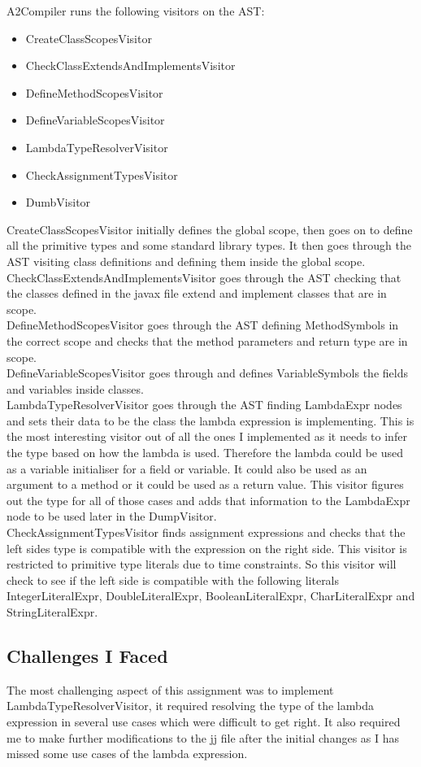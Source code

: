 \documentclass[twocolumn,notitlepage]{report}
\begin{document}
A2Compiler runs the following visitors on the AST:
\begin{itemize}
\item CreateClassScopesVisitor
\item CheckClassExtendsAndImplementsVisitor
\item DefineMethodScopesVisitor
\item DefineVariableScopesVisitor
\item LambdaTypeResolverVisitor
\item CheckAssignmentTypesVisitor
\item DumbVisitor
\end{itemize}
CreateClassScopesVisitor initially defines the global scope, then goes on to
define all the primitive types and some standard library types. It then goes
through the AST visiting class definitions and defining them inside the global
scope.\\
CheckClassExtendsAndImplementsVisitor goes through the AST checking that the
classes defined in the javax file extend and implement classes that are in
scope.\\
DefineMethodScopesVisitor goes through the AST defining MethodSymbols in the
correct scope and checks that the method parameters and return type are in
scope.\\
DefineVariableScopesVisitor goes through and defines VariableSymbols the fields
and variables inside classes.\\
LambdaTypeResolverVisitor goes through the AST finding LambdaExpr nodes and
sets their data to be the class the lambda expression is implementing. This is
the most interesting visitor out of all the ones I implemented as it needs to
infer the type based on how the lambda is used. Therefore the lambda could be used as
a variable initialiser for a field or variable. It could also be used as an argument
to a method or it could be used as a return value. This visitor figures out the
type for all of those cases and adds that information to the LambdaExpr node
to be used later in the DumpVisitor.\\
CheckAssignmentTypesVisitor finds assignment expressions and checks that the
left sides type is compatible with the expression on the right side. This
visitor is restricted to primitive type literals due to time constraints.  So
this visitor will check to see if the left side is compatible with the
following literals IntegerLiteralExpr, DoubleLiteralExpr, BooleanLiteralExpr,
CharLiteralExpr and StringLiteralExpr.

\subsection*{Challenges I Faced}
The most challenging aspect of this assignment was to implement
LambdaTypeResolverVisitor, it required resolving the type of the lambda
expression in several use cases which were difficult to get right. It also
required me to make further modifications to the jj file after the initial
changes as I has missed some use cases of the lambda expression.




\end{document}
